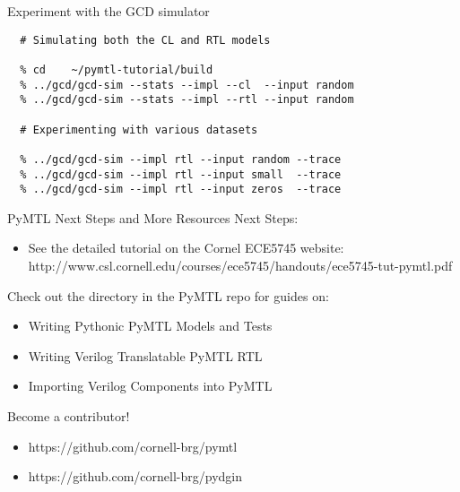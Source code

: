 \begin{task}\begin{frame}[fragile]{Experiment with the GCD simulator}
\vspace{-0.25in}
\begin{verbatim}
  # Simulating both the CL and RTL models

  % cd    ~/pymtl-tutorial/build
  % ../gcd/gcd-sim --stats --impl --cl  --input random
  % ../gcd/gcd-sim --stats --impl --rtl --input random

  # Experimenting with various datasets

  % ../gcd/gcd-sim --impl rtl --input random --trace
  % ../gcd/gcd-sim --impl rtl --input small  --trace
  % ../gcd/gcd-sim --impl rtl --input zeros  --trace

\end{verbatim}
\end{frame}
\end{task}

\begin{frame}{PyMTL Next Steps and More Resources}
Next Steps:
\begin{itemize}
  \item See the detailed tutorial on the Cornel ECE5745 website:
        \footnotesize{http://www.csl.cornell.edu/courses/ece5745/handouts/ece5745-tut-pymtl.pdf}
\end{itemize}

\smallskip
Check out the  directory in the PyMTL repo for guides on:
\begin{itemize}
  \item Writing Pythonic PyMTL Models and Tests
  \item Writing Verilog Translatable PyMTL RTL
  \item Importing Verilog Components into PyMTL
\end{itemize}

\smallskip
Become a contributor!
\begin{itemize}
  \item https://github.com/cornell-brg/pymtl
  \item https://github.com/cornell-brg/pydgin
\end{itemize}
\end{frame}

